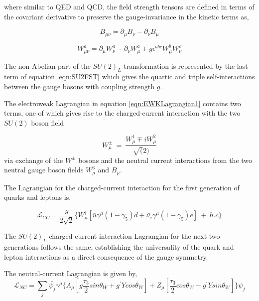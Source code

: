 where similar to QED and QCD, the field strength tensors are defined in terms of the covariant derivative to preserve the gauge-invariance in the kinetic terms as,

\begin{equation}
B_{\mu\nu} = \partial_{\mu}B_{\nu} - \partial_{\nu}B_{\mu}
\label{eqn:U1YFST}
\end{equation}

\begin{equation}
W_{\mu\nu}^{a} = \partial_{\mu}W_{\nu}^{a} - \partial_{\nu}W_{\mu}^{a} + g\epsilon^{abc}W_{\mu}^{b}W_{\nu}^{c}
\label{eqn:SU2FST}
\end{equation}

The non-Abelian part of the $SU(2)_{L}$ transformation is represented by the last term of equation \ref{eqn:SU2FST} which gives the quartic and triple self-interactions between the gauge bosons with coupling strength $g$. 

The electroweak Lagrangian in equation \ref{eqn:EWKLagrangian1} contains two terms, one of which gives rise to the charged-current interaction with the two $SU(2)$ boson field 

\begin{equation}
W^{\pm}_{\mu} ~=~ \frac{ W^{1}_{\mu} \mp iW^{2}_{\mu} } {\sqrt(2)}
\label{eqn:RealWBosons}
\end{equation}
via exchange of the $W^{\pm}$ bosons and the neutral current interactions from the two neutral gauge boson fields $W^{3}_{\mu}$ and $B_{\mu}$. 

The Lagrangian for the charged-current interaction for the first generation of quarks and leptons is, 

\begin{equation}
\mathcal{L}_{CC} = \frac{g}{2\sqrt{2}} \{ W^{\dagger}_{\mu} [\bar{u}\gamma^{\mu}(1-\gamma_{5})d + \bar{\nu_{e}}\gamma^{\mu}(1-\gamma_{5})e ]~+~h.c \}
\label{eqn:SU2CCLag}
\end{equation}

The $SU(2)_{L}$ charged-current interaction Lagrangian for the next two generations follows the same, establishing the universality of the quark and lepton interactions as a direct consequence of the gauge symmetry.

The neutral-current Lagrangian is given by, 
\begin{equation}
\mathcal{L}_{NC} = \sum_{j}{ \bar{\psi_{j}} \gamma^{\mu} \{ A_{\mu} [ g \frac{\tau_{3}}{2} sin\theta_{W} + g^{'} Y cos\theta_{W} ] + Z_{\mu} [ \frac{\tau_{3}}{2} cos\theta_{W} - g^{'} Y sin\theta_{W}] \} \psi_{j} }
\label{eqn:SU2NCLag}
\end{equation}


